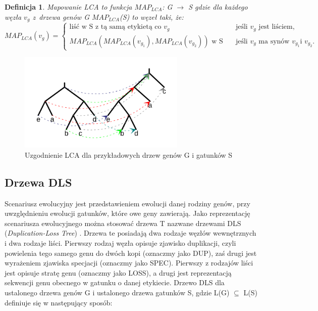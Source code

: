 \documentclass[licencjacka]{pracamgr}
\newtheorem{defi}{Definicja}[section]
\begin{document}
\begin{defi}
Mapowanie LCA to funkcja $MAP_{LCA}$: G $\rightarrow$ S gdzie dla każdego węzła $v_g$ z~drzewa genów G $MAP_{LCA}$(S) to węzeł taki, że:
\[ MAP_{LCA}(v_g) =
  \begin{cases}
    \text{liść w S z tą samą etykietą co }v_g       & \quad \text{jeśli } v_g \text{ jest liściem,}\\
    MAP_{LCA}(MAP_{LCA}(v_{g_1}),MAP_{LCA}(v_{g_2}))\text{ w S}  & \quad \text{jeśli } v_g \text{ ma synów } v_{g_1} \text{i } v_{g_2}.
  \end{cases}
\]
\end{defi}

\begin{figure}[H]
  \centering
  \includegraphics[width=80mm]{./pictures/mapping.png}
  \caption{Uzgodnienie LCA dla przykładowych drzew genów G i gatunków S}
\end{figure}

\subsection{Drzewa DLS}

Scenariusz ewolucyjny jest przedstawieniem ewolucji danej rodziny genów, przy uwzględnieniu ewolucji gatunków, które owe geny zawierają. Jako reprezentację scenariusza ewolucyjnego można stosować drzewa T nazwane drzewami DLS (\textit{Duplication-Loss Tree}) \cite{dls}. Drzewa te posiadają dwa rodzaje węzłów wewnętrznych i dwa rodzaje liści. Pierwszy rodzaj węzła opisuje zjawisko duplikacji, czyli powielenia tego samego genu do dwóch kopi (oznaczmy jako DUP), zaś drugi jest wyrażeniem zjawiska specjacji (oznaczmy jako SPEC). Pierwszy z rodzajów liści jest opisuje stratę genu (oznaczmy jako LOSS), a drugi jest reprezentacją sekwencji genu obecnego w gatunku o danej etykiecie. Drzewo DLS dla ustalonego drzewa genów G i ustalonego drzewa gatunków S, gdzie L(G) $\subseteq$ L(S) definiuje się w następujący sposób:
\end{document}

